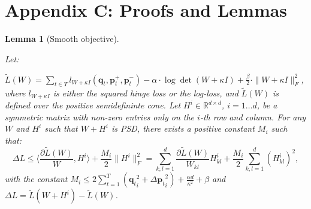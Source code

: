 \documentclass{article} %
\newcommand\mat[1]{{#1}}
\renewcommand\vec[1]{\mathbf{#1}}
\newcommand{\W}{\mat{W}}
\newcommand{\Hh}{\mat{H}}
\newcommand{\R}{\mathbb{R}}
\newcommand{\tL}{\tilde{L}(\W)}
\newcommand{\frobsq}[1]{{\|#1\|_F^2}}
\newcommand{\q}{{\vec{q}}}
\newcommand{\trip}{{t}}
\newcommand{\qt}{{\q_{\trip}}}
\newcommand{\grd}{\frac{\partial \tL}{\W}}
\newcommand{\grdkl}{\frac{\partial \tL}{\W_{kl}}}
\newtheorem{lemma}{Lemma}
\begin{document}
\section*{Appendix C: Proofs and Lemmas}
\label{appendix-proofs}
\begin{lemma}[Smooth objective]
\label{lem:smooth}

Let:

$\tL=\sum\limits_{t\in T}{l_{\W + \kappa I}(\vec{q}_t, \vec{p}_{t}^{+}, \vec{p}_{t}^{-})} -
\alpha \cdot \log \det(\W + \kappa I) + \tfrac{\beta}{2}  \cdot \| \W + \kappa I \|_{F}^{2}$, 
where $l_{\W + \kappa I}$ is either the squared hinge loss or the log-loss, and $\tL$ is defined over the positive semidefininte cone. 
Let $\Hh^i \in \R^{d \times d}$, $i=1 \ldots d$, be a symmetric matrix with non-zero entries only on the $i$-th row and column.
For any $\W$ and $\Hh^i$ such that $\W + \Hh^i$ is PSD, there exists a positive constant $M_i$ such that:
\begin{equation}
\label{eq:ineq}
\Delta L \leq  \langle \grd, \Hh^i \rangle + \frac{M_i}{2} \frobsq{\Hh^i} = \sum_{k,l=1}^d  \grdkl \Hh_{kl}^i + \frac{M_i}{2} \sum_{k,l=1}^d  (\Hh_{kl}^i)^2, \nonumber
\end{equation}
with the constant $M_i \leq  2 \sum_{t=1}^T (\qt_i^2 +{\Delta\vec{p}_{t}}_i^2) + \frac{\alpha d}{\kappa ^2} + \beta$ and $\Delta L = \tilde{L}(\W + \Hh^i) - \tL$.
\end{lemma}
\end{document}
